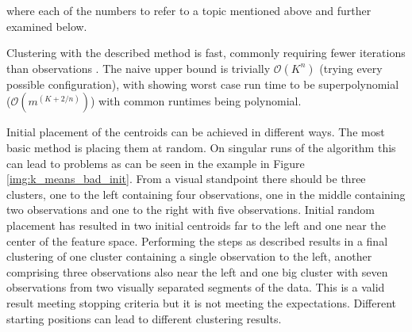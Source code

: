 where each of the numbers  to  refer to a topic mentioned above and further examined below.

Clustering with the described method is fast, commonly requiring fewer iterations than observations \cite{har2005fast}. The naive upper bound is trivially $\mathcal{O}(K^{n})$ (trying every possible configuration), with \cite{arthur2006slow} showing worst case run time to be superpolynomial ($\mathcal{O}(m^{(K+2/n)})$) with common runtimes being polynomial.

 Initial placement of the centroids can be achieved in different ways. The most basic method is placing them at random. On singular runs of the algorithm this can lead to problems as can be seen in the example in Figure \ref{img:k_means_bad_init}. From a visual standpoint there should be three clusters, one to the left containing four observations, one in the middle containing two observations and one to the right with five observations. Initial random placement has resulted in two initial centroids far to the left and one near the center of the feature space. Performing the steps as described results in a final clustering of one cluster containing a single observation to the left, another comprising three observations also near the left and one big cluster with seven observations from two visually separated segments of the data. This is a valid result meeting stopping criteria but it is not meeting the expectations. Different starting positions can lead to different clustering results.

